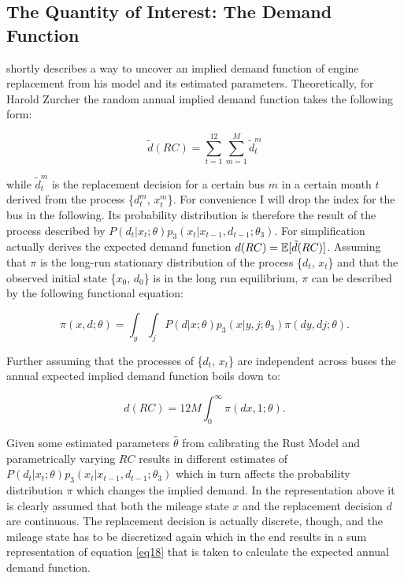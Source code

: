 \subsection{The Quantity of Interest: The Demand Function}

\cite{Rust.1987} shortly describes a way to uncover an implied demand function of engine replacement from his model and its estimated parameters. Theoretically, for Harold Zurcher the random annual implied demand function takes the following form:

\begin{equation*}
	\tilde{d}(RC) = \sum_{t=1}^{12} \sum_{m=1}^{M} \tilde{d}^m_t
\end{equation*}

while $\tilde{d}^m_t$ is the replacement decision for a certain bus $m$ in a certain month $t$ derived from the process \{$d^m_t$, $x^m_t$\}. For convenience I will drop the index for the bus in the following. Its probability distribution is therefore the result of the process described by $P(d_t|x_t; \theta)p_3(x_t|x_{t-1}, d_{t-1}; \theta_3)$. For simplification \citeauthor{Rust.1987} actually derives the expected demand function $d(RC)=\operatorname*{\mathbb{E}}[\tilde{d}(RC)]$. Assuming that $\pi$ is the long-run stationary distribution of the process \{$d_t$, $x_t$\} and that the observed initial state \{$x_0$, $d_0$\} is in the long run equilibrium, $\pi$ can be described by the following functional equation:

\begin{equation}
	\label{eq18}
	\pi(x, d; \theta) = \int_{y} \int_{j} P(d|x; \theta)p_3(x|y, j; \theta_3) \pi(dy, dj; \theta).
\end{equation}

Further assuming that the processes of \{$d_t$, $x_t$\} are independent across buses the annual expected implied demand function boils down to:

\begin{equation}
	\label{eq19}
	d(RC) = 12 M \int_{0}^{\infty} \pi(dx, 1; \theta).
\end{equation}

Given some estimated parameters $\hat\theta$ from calibrating the Rust Model and parametrically varying $RC$ results in different estimates of $P(d_t|x_t; \theta)p_3(x_t|x_{t-1}, d_{t-1}; \theta_3)$ which in turn affects the probability distribution $\pi$ which changes the implied demand. In the representation above it is clearly assumed that both the mileage state $x$ and the replacement decision $d$ are continuous. The replacement decision is actually discrete, though, and the mileage state has to be discretized again which in the end results in a sum representation of equation \ref{eq18} that is taken to calculate the expected annual demand function.
